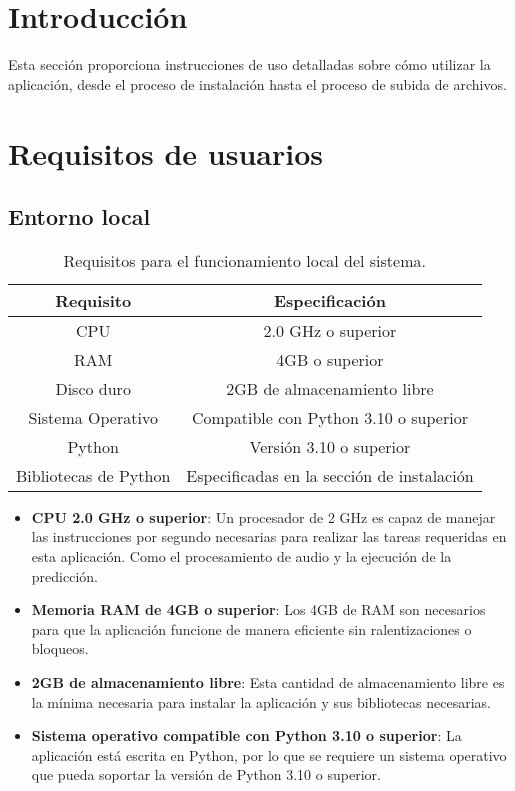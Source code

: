 
\section{Introducción}

Esta sección proporciona instrucciones de uso detalladas sobre cómo utilizar la aplicación, desde el proceso de instalación hasta el proceso de subida de archivos.

\section{Requisitos de usuarios}

\subsection{Entorno local}

\begin{table}[h]
	\centering
	\begin{tabular}{|c|c|}
		\hline
		\textbf{Requisito} & \textbf{Especificación}\\
		\hline
		CPU & 2.0 GHz o superior\\
		\hline
		RAM & 4GB o superior\\
		\hline
		Disco duro & 2GB de almacenamiento libre\\
		\hline
		Sistema Operativo & Compatible con Python 3.10 o superior\\
		\hline
		Python & Versión 3.10 o superior\\
		\hline
		Bibliotecas de Python & Especificadas en la sección de instalación\\
		\hline
	\end{tabular}
	\caption{Requisitos para el funcionamiento local del sistema.}
\end{table}

\begin{itemize}
\tightlist

\item \textbf{CPU 2.0 GHz o superior}: Un procesador de 2 GHz es capaz de manejar las instrucciones por segundo necesarias para realizar las tareas requeridas en esta aplicación. Como el procesamiento de audio y la ejecución de la predicción.

\item \textbf{Memoria RAM de 4GB o superior}: Los 4GB de RAM son necesarios para que la aplicación funcione de manera eficiente sin ralentizaciones o bloqueos.

\item \textbf{2GB de almacenamiento libre}: Esta cantidad de almacenamiento libre es la mínima necesaria para instalar la aplicación y sus bibliotecas necesarias.

\item \textbf{Sistema operativo compatible con Python 3.10 o superior}: La aplicación está escrita en Python, por lo que se requiere un sistema operativo que pueda soportar la versión de Python 3.10 o superior.

\end{itemize}

